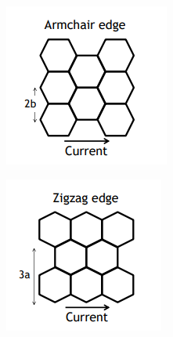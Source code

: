 \documentclass{beamer}
\begin{document}
{\begin{frame}
\begin{figure}[!htbp]
   \begin{subfigure}{0.2\textwidth}
   \includegraphics[width=\linewidth]{armchair.png}
   \end{subfigure}
   \hspace{0.5cm}
   \begin{subfigure}{0.2\textwidth}
   \includegraphics[width=\linewidth]{zigzag.png}
   \end{subfigure}
\end{figure}


\end{frame}}
\end{document}

